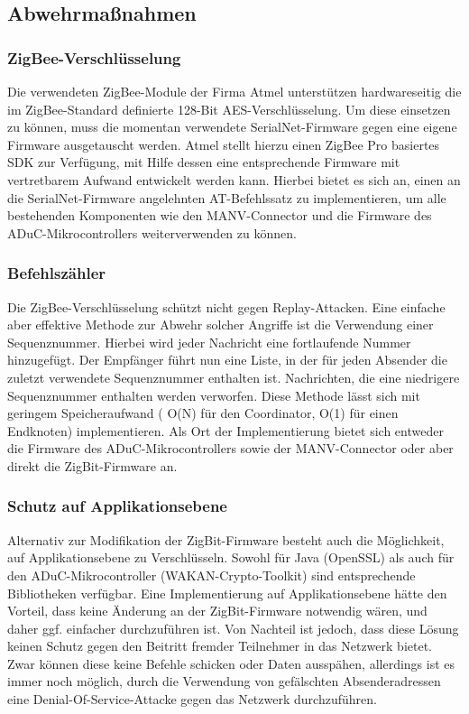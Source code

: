 \subsection{Abwehrmaßnahmen}

\subsubsection{ZigBee-Verschlüsselung}
Die verwendeten ZigBee-Module der Firma Atmel unterstützen hardwareseitig die im ZigBee-Standard definierte 128-Bit 
AES-Verschlüsselung. Um diese einsetzen zu können, muss die momentan verwendete SerialNet-Firmware gegen eine eigene
Firmware ausgetauscht werden. Atmel stellt hierzu einen ZigBee Pro basiertes SDK zur Verfügung, mit Hilfe dessen
eine entsprechende Firmware mit vertretbarem Aufwand entwickelt werden kann. Hierbei bietet es sich an, einen an die
SerialNet-Firmware angelehnten AT-Befehlssatz zu implementieren, um alle bestehenden Komponenten wie den MANV-Connector
und die Firmware des ADuC-Mikrocontrollers weiterverwenden zu können.

\subsubsection{Befehlszähler}
Die ZigBee-Verschlüsselung schützt nicht gegen Replay-Attacken. Eine einfache aber effektive Methode zur Abwehr solcher
Angriffe ist die Verwendung einer Sequenznummer. Hierbei wird jeder Nachricht eine fortlaufende Nummer hinzugefügt. 
Der Empfänger führt nun eine Liste, in der für jeden Absender die zuletzt verwendete Sequenznummer enthalten ist.
Nachrichten, die eine niedrigere Sequenznummer enthalten werden verworfen. Diese Methode lässt sich mit geringem
Speicheraufwand ( O(N) für den Coordinator, O(1) für einen Endknoten) implementieren. Als Ort der Implementierung
bietet sich entweder die Firmware des ADuC-Mikrocontrollers sowie der MANV-Connector oder aber direkt die ZigBit-Firmware
an.

\subsubsection{Schutz auf Applikationsebene}
Alternativ zur Modifikation der ZigBit-Firmware besteht auch die Möglichkeit, auf Applikationsebene zu Verschlüsseln.
Sowohl für Java (OpenSSL) als auch für den ADuC-Mikrocontroller (WAKAN-Crypto-Toolkit) sind entsprechende Bibliotheken
verfügbar. Eine Implementierung auf Applikationsebene hätte den Vorteil, dass keine Änderung an der ZigBit-Firmware
notwendig wären, und daher ggf. einfacher durchzuführen ist. Von Nachteil ist jedoch, dass diese Lösung keinen Schutz
gegen den Beitritt fremder Teilnehmer in das Netzwerk bietet. Zwar können diese keine Befehle schicken oder Daten ausspähen,
allerdings ist es immer noch möglich, durch die Verwendung von gefälschten Absenderadressen eine Denial-Of-Service-Attacke
gegen das Netzwerk durchzuführen. 

